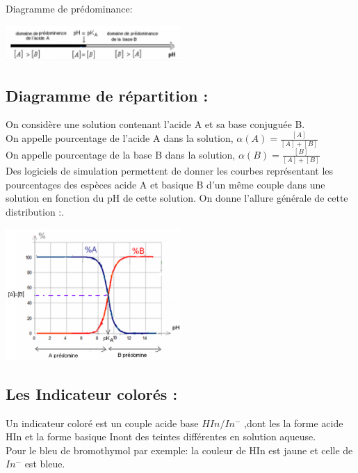 \documentclass[12pt]{article}
\begin{document}
Diagramme de prédominance:

\begin{center}
	\includegraphics[width=0.5\textwidth]{./img/domainonace.png}
\end{center}



\subsection{Diagramme de répartition : }

On considère une solution contenant l'acide A et sa base conjuguée B.
\\On appelle pourcentage de l'acide A dans la solution, $\alpha(A) = \frac{[A]}{[A]+[B]}$
\\On appelle pourcentage de la base B dans la solution, $\alpha(B) = \frac{[B]}{[A]+[B]}$
\\Des logiciels de simulation permettent de donner les courbes représentant les pourcentages des espèces acide A et
basique B d’un même couple dans une solution en fonction du pH de cette solution. On donne l’allure générale de
cette distribution :.


\begin{center}
	\includegraphics[width=0.5\textwidth]{./img/dominPH.png}
\end{center}

\subsection{Les Indicateur colorés : }
Un indicateur coloré est un couple acide base $HIn/In^-$ ,dont les la forme acide HIn et la forme basique Inont des teintes différentes en solution aqueuse.
\\Pour le bleu de bromothymol par exemple: la couleur de HIn est jaune et celle de $In^-$ est bleue.
\end{document}
